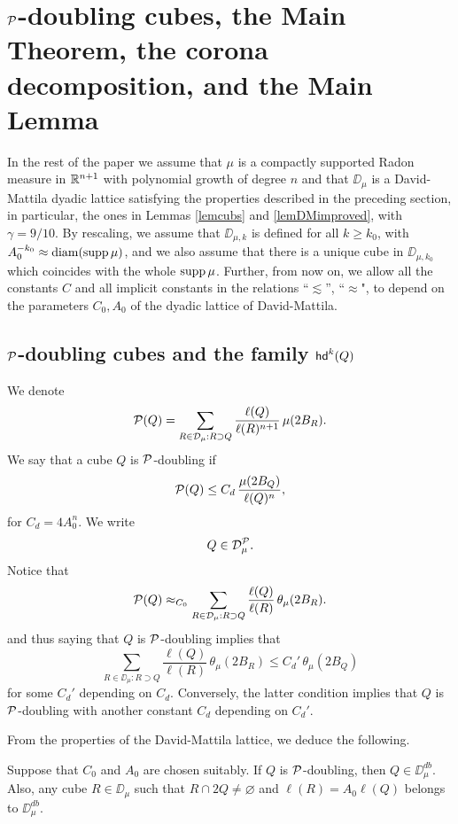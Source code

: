 \section{\texorpdfstring{${\mathcal P}$}{P}-doubling cubes, the Main Theorem, the corona decomposition, and the Main Lemma}\label{sec:Pdoubling}

In the rest of the paper we assume that $\mu$ is a compactly supported Radon measure in ${\mathbb R}^{n+1}$ with polynomial 
growth of degree $n$ and
that $\DD_\mu$ is a David-Mattila dyadic lattice satisfying the properties 
described in the preceding section, in particular, the ones in Lemmas \ref{lemcubs}
and \ref{lemDMimproved}, with $\gamma=9/10$.
By rescaling, we assume that $\DD_{\mu,k}$ is defined for all $k\geq k_0$, with $A_0^{-k_0}\approx
{\rm diam}(\operatorname{supp}\mu)$, and we also assume that there is a unique cube in $\DD_{\mu,k_0}$ which coincides
with the whole $\operatorname{supp}\mu$.
Further, from now on, we allow all the constants $C$ and all implicit constants in the relations
``$\lesssim$'', ``$\approx$", to depend on the parameters $C_0, A_0$ of the dyadic lattice of David-Mattila.


\subsection{\texorpdfstring{${\mathcal P}$}{P}-doubling cubes and the family \texorpdfstring{${\mathsf{hd}}^k(Q)$}{hdk(Q)}}\label{subsec:Pdoubling}

We denote
$${\mathcal P}(Q) = \sum_{R\in{\mathcal D}_\mu:R\supset Q} \frac{\ell(Q)}{\ell(R)^{n+1}} \,\mu(2B_R).$$
We say that a cube $Q$ is ${\mathcal P}$-doubling if
$${\mathcal P}(Q) \leq C_d\,\frac{\mu(2B_Q)}{\ell(Q)^n},$$
for  $C_d =4A_0^n$. We write
$$Q\in{\mathcal D}_\mu^{\mathcal P}.$$
Notice that
$${\mathcal P}(Q) \approx_{C_0} \sum_{R\in{\mathcal D}_\mu:R\supset Q} \frac{\ell(Q)}{\ell(R)} \,\theta_\mu(2B_R).$$
and thus saying that $Q$ is ${\mathcal P}$-doubling implies that 
$$\sum_{R\in\DD_\mu:R\supset Q} \frac{\ell(Q)}{\ell(R)} \,\theta_\mu(2B_R)\leq C_d'\,\theta_\mu(2B_Q)$$
for some $C_d'$ depending on $C_d$. Conversely, the latter condition implies that $Q$ is ${\mathcal P}$-doubling with another constant $C_d$ depending on $C_d'$.

From the properties of the David-Mattila lattice, we deduce the following.

\begin{lemma}\label{lempois00}
	Suppose that $C_0$ and $A_0$ are chosen suitably. If $Q$ is ${\mathcal P}$-doubling, then $Q\in\DD_\mu^{db}$.
	Also, any cube $R\in\DD_\mu$ such that $R\cap 2Q\neq\varnothing$ and $\ell(R)=A_0\ell(Q)$ belongs to $\DD_\mu^{db}$.
\end{lemma}

